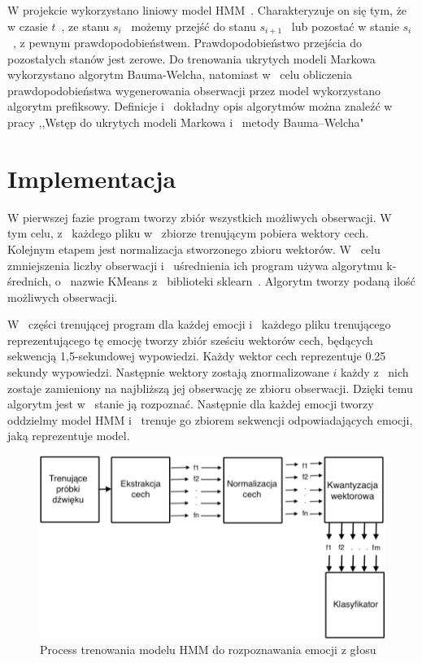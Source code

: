 \documentclass[declaration,shortabstract]{iithesis}
\begin{document}
W projekcie wykorzystano liniowy model HMM~\cite[Chapter~8.1]{HMM_pattern}. Charakteryzuje on się tym, że w czasie $t$~, ze stanu $s_{i}$~ możemy przejść do stanu $s_{i+1}$~ lub pozostać w stanie $s_{i}$~, z pewnym prawdopodobieństwem. Prawdopodobieństwo przejścia do pozostałych stanów jest zerowe. Do trenowania ukrytych modeli Markowa wykorzystano algorytm Bauma-Welcha, natomiast w~ celu obliczenia prawdopodobieństwa wygenerowania obserwacji przez model wykorzystano algorytm prefiksowy. Definicje i~ dokładny opis algorytmów można znaleźć w pracy ,,Wstęp do ukrytych modeli Markowa i~ metody Bauma–Welcha"~\cite{HMM_Wstep}

\section{Implementacja}
W pierwszej fazie program tworzy zbiór wszystkich możliwych obserwacji. W~ tym celu, z~ każdego pliku w~ zbiorze trenującym pobiera wektory cech. Kolejnym etapem jest normalizacja stworzonego zbioru wektorów. W~ celu zmniejszenia liczby obserwacji i~ uśrednienia ich program używa algorytmu k-średnich, o~ nazwie KMeans z~ biblioteki sklearn~\cite{sklearn}. Algorytm tworzy podaną ilość możliwych obserwacji.

W~ części trenującej program dla każdej emocji i~ każdego pliku trenującego reprezentującego tę emocję tworzy zbiór sześciu wektorów cech, będących sekwencją 1,5-sekundowej wypowiedzi. Każdy wektor cech reprezentuje 0.25 sekundy wypowiedzi. Następnie wektory zostają znormalizowane $i$ każdy z~ nich zostaje zamieniony na najbliższą jej obserwację ze zbioru obserwacji. Dzięki temu algorytm jest w~ stanie ją rozpoznać. Następnie dla każdej emocji tworzy oddzielmy model HMM i~ trenuje go zbiorem sekwencji odpowiadających emocji, jaką reprezentuje model.

\begin{figure}[!ht]
\hspace*{-5cm}  
	\caption{Process trenowania modelu HMM do rozpoznawania emocji z głosu}
	\includegraphics[scale=0.35]{hmm_train.png}
\end{figure}
\end{document}

